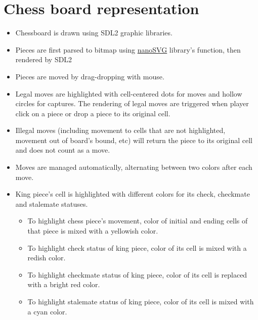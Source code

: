\documentclass[a4paper, 10pt, titlepage]{report}
\begin{document}
\section{Chess board representation}
\begin{itemize}
  \item Chessboard is drawn using SDL2 graphic libraries.
  \item Pieces are first parsed to bitmap using \href{https://github.com/memononen/nanosvg}{nanoSVG} library's function, then rendered by SDL2
  \item Pieces are moved by drag-dropping with mouse.
  \item Legal moves are highlighted with cell-centered dots for moves and hollow circles for captures. The rendering of legal moves are triggered when player click on a piece or drop a piece to its original cell.
  \item Illegal moves (including movement to cells that are not highlighted, movement out of board's bound, etc) will return the piece to its original cell and does not count as a move.
  \item Moves are managed automatically, alternating between two colors after each move.
  \item King piece's cell is highlighted with different colors for its check, checkmate and stalemate statuses.
        \begin{itemize}
          \item To highlight chess piece's movement, color of initial and ending cells of that piece is mixed with a yellowish color.
          \item To highlight check status of king piece, color of its cell is mixed with a redish color.
          \item To highlight checkmate status of king piece, color of its cell is replaced with a bright red color.
          \item To highlight stalemate status of king piece, color of its cell is mixed with a cyan color.
        \end{itemize}
\end{itemize}
\end{document}
